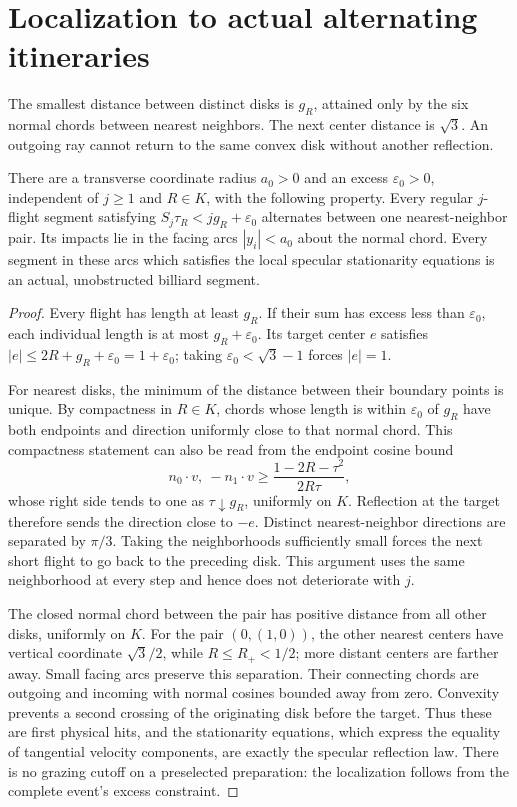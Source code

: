 \section{Localization to actual alternating itineraries}
\label{sec:geometry}
The smallest distance between distinct disks is $g_R$, attained only
by the six normal chords between nearest neighbors. The next center
distance is $\sqrt3$. An outgoing ray cannot return to the same convex
disk without another reflection.

\begin{lemma}\label{lem:localization}
There are a transverse coordinate radius $a_0>0$ and an excess
$\varepsilon_0>0$, independent of $j\ge1$ and $R\in K$, with the
following property. Every regular $j$-flight segment satisfying
$S_j\tau_R<jg_R+\varepsilon_0$ alternates between one nearest-neighbor
pair. Its impacts lie in the facing arcs $|y_i|<a_0$ about the normal
chord. Every segment in these arcs which satisfies the local specular
stationarity equations is an actual, unobstructed billiard segment.
\end{lemma}
\begin{proof}
Every flight has length at least $g_R$. If their sum has excess less
than $\varepsilon_0$, each individual length is at most
$g_R+\varepsilon_0$. Its target center $e$ satisfies
$|e|\le2R+g_R+\varepsilon_0=1+\varepsilon_0$; taking
$\varepsilon_0<\sqrt3-1$ forces $|e|=1$.

For nearest disks, the minimum of the distance between their boundary
points is unique. By compactness in $R\in K$, chords whose length is
within $\varepsilon_0$ of $g_R$ have both endpoints and direction
uniformly close to that normal chord. This compactness statement can
also be read from the endpoint cosine bound
\[
 n_0\cdot v,\ -n_1\cdot v
 \ge\frac{1-2R-\tau^2}{2R\tau},
\]
whose right side tends to one as $\tau\downarrow g_R$, uniformly on
$K$. Reflection at the target therefore sends the direction close to
$-e$. Distinct nearest-neighbor directions are separated by $\pi/3$.
Taking the neighborhoods sufficiently small forces the next short
flight to go back to the preceding disk. This argument uses the same
neighborhood at every step and hence does not deteriorate with $j$.

The closed normal chord between the pair has positive distance from
all other disks, uniformly on $K$. For the pair $(0,(1,0))$, the other
nearest centers have vertical coordinate $\sqrt3/2$, while
$R\le R_+<1/2$; more distant centers are farther away. Small facing
arcs preserve this separation. Their connecting chords are outgoing
and incoming with normal cosines bounded away from zero. Convexity
prevents a second crossing of the originating disk before the target.
Thus these are first physical hits, and the stationarity equations,
which express the equality of tangential velocity components, are
exactly the specular reflection law. There is no grazing cutoff on a
preselected preparation: the localization follows from the complete
event's excess constraint.
\end{proof}

